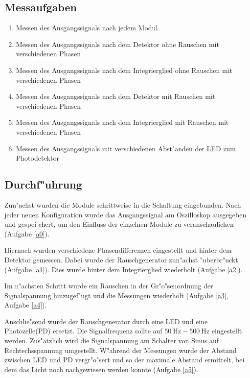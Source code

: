 \documentclass{scrartcl}
\begin{document}
		\subsection{Messaufgaben}

			\begin{enumerate}
				\item \label{a0} Messen des Ausgangssignals nach jedem Modul
				\item \label{a1} Messen des Ausgangssignals nach dem Detektor ohne Rauschen mit verschiedenen Phasen
				\item \label{a2} Messen des Ausgangssignals nach dem Integrierglied ohne Rauschen mit verschiedenen Phasen
				\item \label{a3} Messen des Ausgangssignals nach dem Detektor mit Rauschen mit verschiedenen Phasen
				\item \label{a4} Messen des Ausgangssignals nach dem Integrierglied mit Rauschen mit verschiedenen Phasen
				\item \label{a5} Messen des Ausgangssignals mit verschiedenen Abst"anden der LED zum Photodetektor
			\end{enumerate}

		\subsection{Durchf"uhrung}

			Zun"achst wurden die Module schrittweise in die Schaltung eingebunden.
			Nach jeder neuen Konfiguration wurde das Ausgangssignal am Oszilloskop ausgegeben und gespei-chert,
			um den Einfluss der einzelnen Module zu veranschaulichen (Aufgabe \ref{a0}).

			Hiernach wurden verschiedene Phasendifferenzen eingestellt und hinter dem Detektor gemessen.
			Dabei wurde der Rauschgenerator zun"achst "uberbr"uckt (Aufgabe \ref{a1}).
			Dies wurde hinter dem Integrierglied wiederholt (Aufgabe \ref{a2}).

			Im n"achsten Schritt wurde ein Rauschen in der Gr"o"senordnung der Signalspannung hinzugef"ugt und die Messungen
			wiederholt (Aufgabe \ref{a3}, Aufgabe \ref{a4}).

			Anschlie"send wurde der Rauschgenerator durch eine LED und eine Photozelle(PD) ersetzt.
			Die Signalfrequenz sollte auf $\SI{50}{\hertz}-\SI{500}{\hertz}$ eingestellt werden.
			Zus"atzlich wird die Signalspannung am Schalter von Sinus auf Rechtechsspannung umgestellt.
			W"ahrend der Messungen wurde der Abstand zwischen LED und PD vergr"o"sert und so der maximale Abstand ermittelt,
			bei dem das Licht noch nachgewiesen werden konnte (Aufgabe \ref{a5}).
\end{document}
